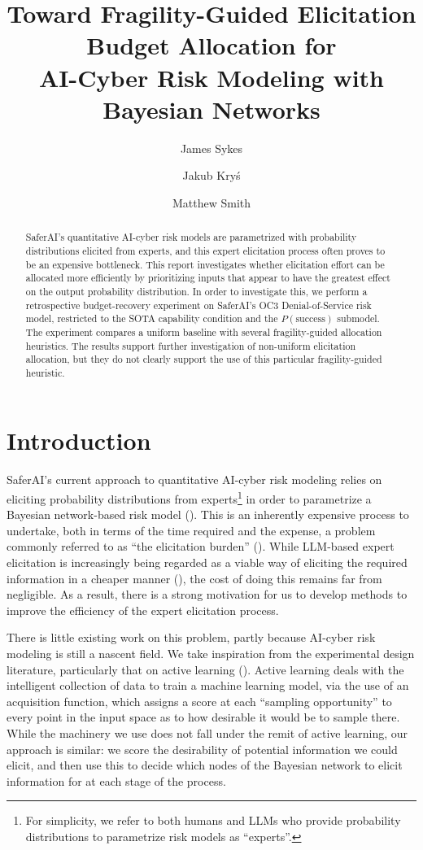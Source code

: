 \documentclass[11pt]{article}
\title{Toward Fragility-Guided Elicitation Budget Allocation for \\ AI-Cyber Risk Modeling with Bayesian Networks}
\author[1]{James Sykes}
\author[2]{Jakub Kry\'{s}}
\author[2]{Matthew Smith}
\affil[1]{Department of Statistics, University of Warwick}
\affil[2]{SaferAI}
\date{}
\begin{document}
\maketitle

\begin{abstract}
SaferAI’s quantitative AI-cyber risk models are parametrized with probability distributions elicited from experts, and this expert elicitation process often proves to be an expensive bottleneck. This report investigates whether elicitation effort can be allocated more efficiently by prioritizing inputs that appear to have the greatest effect on the output probability distribution. In order to investigate this, we perform a retrospective budget-recovery experiment on SaferAI’s OC3 Denial-of-Service risk model, restricted to the SOTA capability condition and the $P(\text{success})$ submodel. The experiment compares a uniform baseline with several fragility-guided allocation heuristics. The results support further investigation of non-uniform elicitation allocation, but they do not clearly support the use of this particular fragility-guided heuristic.
\end{abstract}

\tableofcontents
\newpage

\section{Introduction}

SaferAI's current approach to quantitative AI-cyber risk modeling relies on eliciting probability distributions from experts\footnote{For simplicity, we refer to both humans and LLMs who provide probability distributions to parametrize risk models as ``experts''.} in order to parametrize a Bayesian network-based risk model (\cite{barrett2025toward}). This is an inherently expensive process to undertake, both in terms of the time required and the expense, a problem commonly referred to as ``the elicitation burden'' (\cite{barons2022balancing}). While LLM-based expert elicitation is increasingly being regarded as a viable way of eliciting the required information in a cheaper manner (\cite{halawi2024approaching}), the cost of doing this remains far from negligible. As a result, there is a strong motivation for us to develop methods to improve the efficiency of the expert elicitation process.

There is little existing work on this problem, partly because AI-cyber risk modeling is still a nascent field. We take inspiration from the experimental design literature, particularly that on active learning (\cite{settles2009active}). Active learning deals with the intelligent collection of data to train a machine learning model, via the use of an acquisition function, which assigns a score at each ``sampling opportunity'' to every point in the input space as to how desirable it would be to sample there. While the machinery we use does not fall under the remit of active learning, our approach is similar: we score the desirability of potential information we could elicit, and then use this to decide which nodes of the Bayesian network to elicit information for at each stage of the process.
\end{document}
